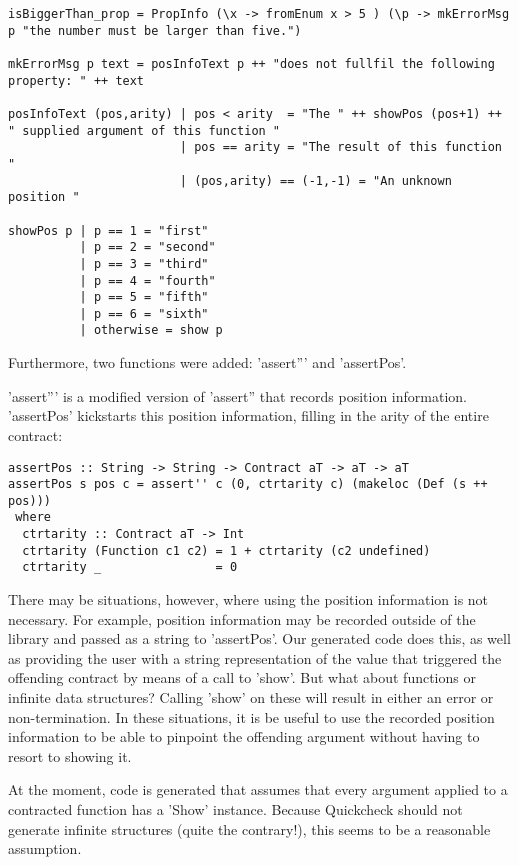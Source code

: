 \documentclass[10pt]{report}
\begin{document}
\begin{lstlisting}
isBiggerThan_prop = PropInfo (\x -> fromEnum x > 5 ) (\p -> mkErrorMsg p "the number must be larger than five.")

mkErrorMsg p text = posInfoText p ++ "does not fullfil the following property: " ++ text

posInfoText (pos,arity) | pos < arity  = "The " ++ showPos (pos+1) ++ " supplied argument of this function "
                        | pos == arity = "The result of this function "
                        | (pos,arity) == (-1,-1) = "An unknown position "

showPos p | p == 1 = "first"
          | p == 2 = "second"
          | p == 3 = "third"
          | p == 4 = "fourth"
          | p == 5 = "fifth"
          | p == 6 = "sixth"
          | otherwise = show p
\end{lstlisting}

Furthermore, two functions were added: 'assert''' and 'assertPos'.

'assert''' is a modified version of 'assert'' that records position information.
'assertPos' kickstarts this position information, filling in the arity of the entire contract:

\begin{lstlisting}
assertPos :: String -> String -> Contract aT -> aT -> aT
assertPos s pos c = assert'' c (0, ctrtarity c) (makeloc (Def (s ++ pos)))
 where
  ctrtarity :: Contract aT -> Int
  ctrtarity (Function c1 c2) = 1 + ctrtarity (c2 undefined)
  ctrtarity _                = 0
\end{lstlisting}

There may be situations, however, where using the position information is not necessary.
For example, position information may be recorded outside of the library and passed as a string to 'assertPos'.
Our generated code does this, as well as providing the user with a string representation of the value that triggered the offending contract by means of a call to 'show'.
But what about functions or infinite data structures? Calling 'show' on these will result in either an error or non-termination.
In these situations, it is be useful to use the recorded position information to be able to pinpoint the offending argument without having to resort to showing it.

At the moment, code is generated that assumes that every argument applied to a contracted function has a 'Show' instance. Because Quickcheck should not generate infinite structures (quite the contrary!), this seems to be a reasonable assumption.
\end{document}

